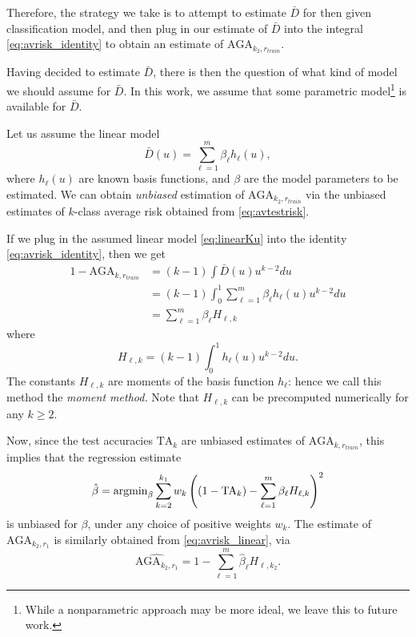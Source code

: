 Therefore, the strategy we take is to attempt to estimate $\bar{D}$
for then given classification model, and then plug in our estimate of
$\bar{D}$ into the integral \eqref{eq:avrisk_identity} to obtain an
estimate of $\text{AGA}_{k_2, r_{train}}$.

Having decided to estimate $\bar{D}$, there is then the question of
what kind of model we should assume for $\bar{D}$.  In this work, we
assume that some parametric model\footnote{While a
nonparametric approach may be more ideal, we leave this to future work.} is available for $\bar{D}$.

Let us assume the linear model
\begin{equation}\label{eq:linearKu}
\bar{D}(u) = \sum_{\ell = 1}^m \beta_\ell h_\ell(u),
\end{equation}
where $h_\ell(u)$ are known basis functions, and $\beta$ are the model
parameters to be estimated. We can obtain \emph{unbiased} estimation
of $\text{AGA}_{k_2, r_{train}}$ via the unbiased estimates of
$k$-class average risk obtained from \eqref{eq:avtestrisk}.

If we plug in the assumed linear model \eqref{eq:linearKu} into the
identity \eqref{eq:avrisk_identity}, then we get
\begin{align}
1 - \text{AGA}_{k, r_{train}} &= (k-1)\int \bar{D}(u) u^{k-2} du
\\&= (k-1)\int_0^1 \sum_{\ell = 1}^m \beta_\ell h_\ell(u) u^{k-2} du
\\&= \sum_{\ell = 1}^m \beta_\ell H_{\ell,k} \label{eq:avrisk_linear}
\end{align}
where
\begin{equation}
H_{\ell,k} = (k-1) \int_0^1 h_\ell(u) u^{k-2} du.
\end{equation}
The constants $H_{\ell, k}$ are moments of the basis function
$h_\ell$: hence we call this method the \emph{moment method.}  Note
that $H_{\ell, k}$ can be precomputed numerically for any $k \geq 2$.


Now, since the test accuracies $\text{TA}_k$ are unbiased estimates of
$\text{AGA}_{k, r_{train}}$, this implies that the regression
estimate
\[
\hat{\beta} = \text{argmin}_\beta \sum_{k=2}^{k_1} w_k \left( (1 - \text{TA}_k) - \sum_{\ell=1}^m \beta_\ell H_{\ell, k}\right)^2
\]
is unbiased for $\beta$, under any choice of positive weights $w_k$.
The estimate of $\text{AGA}_{k_2,r_1}$ is similarly obtained
from \eqref{eq:avrisk_linear}, via
\begin{equation}\label{eq:avrisk_hat}
\widehat{\text{AGA}_{k_2,r_1}} = 1 - \sum_{\ell=1}^m \hat{\beta}_\ell H_{\ell, k_2}.
\end{equation}

